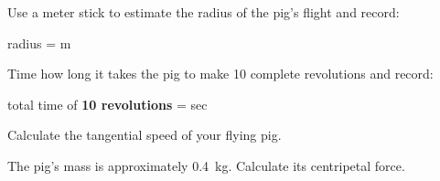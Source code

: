 \documentclass[10pt]{exam}
\begin{document}
\begin{questions}
\question
  Use a meter stick to estimate the radius of the pig's flight and record: 

  \vspace{1em}

  radius = \fillin[][6em] m

  \vspace{1em}

\question
  Time how long it takes the pig to make 10 complete revolutions and record: 

  \vspace{1em}
  
  total time of {\bf 10 revolutions} = \fillin[][6em] sec

  \vspace{1em}

\question
  Calculate the tangential speed of your flying pig.  
  \vs[2]

\question
  The pig's mass is approximately 0.4~kg.  Calculate its centripetal force.
  \vs


  


\end{questions}
\end{document}
